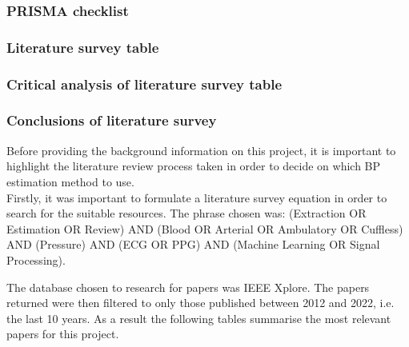 \subsubsection{PRISMA checklist}

\subsubsection{Literature survey table}

\subsubsection{Critical analysis of literature survey table}

\subsubsection{Conclusions of literature survey}

Before providing the background information on this project, it is important to highlight 
the literature review process taken in order to decide on which BP estimation method to 
use.\\ \newline \noindent Firstly, it was important to formulate a literature survey equation in order to search 
for the suitable resources. The phrase chosen was: 
(Extraction OR Estimation OR Review) AND (Blood OR Arterial OR Ambulatory OR Cuffless) AND (Pressure) AND (ECG OR PPG) AND (Machine Learning OR Signal Processing).

The database chosen to research for papers was IEEE Xplore. The papers returned were then filtered 
to only those published between 2012 and 2022, i.e. the last 10 years. As a result the following tables summarise 
the most relevant papers for this project.



